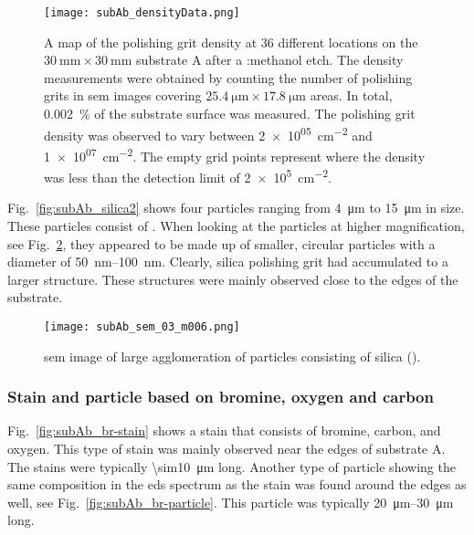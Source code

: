 \begin{figure}[htbp]
    \centering
    \texttt{[image: subAb\_densityData.png]}
    \caption[Map of the polishing grit density on substrate A after a :methanol etch.]{A map of the polishing grit density at 36 different locations on the $\SI{30}{\milli\metre}\times\SI{30}{\milli\metre}$ substrate A after a :methanol etch. The density measurements were obtained by counting the number of polishing grits in \ac{sem} images covering $\SI{25.4}{\micro\metre}\times\SI{17.8}{\micro\metre}$ areas. In total, \SI{0.002}{\percent} of the substrate surface was measured. The polishing grit density was observed to vary between \SI{2e+05}{\centi\metre^{-2}} and \SI{1e+07}{\centi\metre^{-2}}. The empty grid points represent where the density was less than the detection limit of \SI{2e+5}{\centi\metre^{-2}}.}
    \label{fig:subAb_densityData}
\end{figure}

Fig.~\ref{fig:subAb_silica2} shows four particles ranging from \SI{4}{\micro\metre} to \SI{15}{\micro\metre} in size. These particles consist of . When looking at the particles at higher magnification, see Fig.~\ref{fig:subAb_silica2_magnified}, they appeared to be made up of smaller, circular particles with a diameter of \SIrange{50}{100}{\nano\metre}. Clearly, silica polishing grit had accumulated to a larger structure. These structures were mainly observed close to the edges of the substrate.

\begin{figure}
    \centering
    \texttt{[image: subAb\_sem\_03\_m006.png]}
    \caption[\Ac{sem} image of large silica agglomeration.]{\Ac{sem} image of large agglomeration of particles consisting of silica ().}\label{fig:subAb_silica2_magnified}
\end{figure}

\subsubsection{Stain and particle based on bromine, oxygen and carbon}

Fig.~\ref{fig:subAb_br-stain} shows a stain that consists of bromine, carbon, and oxygen. This type of stain was mainly observed  near the edges of substrate A. The stains were typically \SI{\sim10}{\micro\metre} long. Another type of particle showing the same composition in the \ac{eds} spectrum as the stain was found around the edges as well, see Fig.~\ref{fig:subAb_br-particle}. This particle was typically \SIrange{20}{30}{\micro\metre} long.

